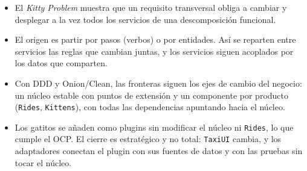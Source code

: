 \begin{itemize}
  \item El \emph{Kitty Problem} \parencite[pp.~242--244]{martin2017clean} muestra que un requisito
    transversal obliga a cambiar y desplegar a la vez todos los servicios de una descomposición
    funcional.
  \item El origen es partir por pasos (verbos) o por entidades. Así se reparten entre servicios las
    reglas que cambian juntas, y los servicios siguen acoplados por los datos que comparten.
  \item Con DDD y Onion/Clean, las fronteras siguen los ejes de cambio del negocio: un núcleo estable
    con puntos de extensión y un componente por producto (\texttt{Rides}, \texttt{Kittens}), con
    todas las dependencias apuntando hacia el núcleo.
  \item Los gatitos se añaden como plugins sin modificar el núcleo ni \texttt{Rides}, lo que cumple
    el OCP. El cierre es estratégico y no total: \texttt{TaxiUI} cambia, y los adaptadores conectan
    el plugin con sus fuentes de datos y con las pruebas sin tocar el núcleo.
\end{itemize}
